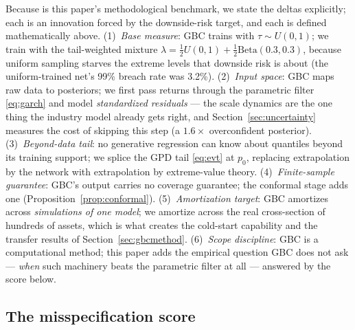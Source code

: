 \documentclass[11pt]{article}
\theoremstyle{remark}
\begin{document}
Because \citet{polson2023gbc} is this paper's methodological benchmark,
we state the deltas explicitly; each is an innovation forced by the
downside-risk target, and each is defined mathematically above.
(1)~\emph{Base measure}: GBC trains with $\tau \sim U(0,1)$; we train
with the tail-weighted mixture $\lambda = \tfrac12 U(0,1) + \tfrac12
\mathrm{Beta}(0.3,0.3)$, because uniform sampling starves the extreme
levels that downside risk is about (the uniform-trained net's 99\%
breach rate was 3.2\%).
(2)~\emph{Input space}: GBC maps raw data to posteriors; we first pass
returns through the parametric filter \eqref{eq:garch} and model
\emph{standardized residuals} --- the scale dynamics are the one thing
the industry model already gets right, and Section~\ref{sec:uncertainty}
measures the cost of skipping this step (a $1.6\times$ overconfident
posterior).
(3)~\emph{Beyond-data tail}: no generative regression can know about
quantiles beyond its training support; we splice the GPD tail
\eqref{eq:evt} at $p_0$, replacing extrapolation by the network with
extrapolation by extreme-value theory.
(4)~\emph{Finite-sample guarantee}: GBC's output carries no coverage
guarantee; the conformal stage adds one
(Proposition~\ref{prop:conformal}).
(5)~\emph{Amortization target}: GBC amortizes across \emph{simulations
of one model}; we amortize across the real cross-section of hundreds of
assets, which is what creates the cold-start capability and the
transfer results of Section~\ref{sec:gbcmethod}.
(6)~\emph{Scope discipline}: GBC is a computational method; this paper
adds the empirical question GBC does not ask --- \emph{when} such
machinery beats the parametric filter at all --- answered by the
score below.

\subsection{The misspecification score}\label{sec:score}
\end{document}
